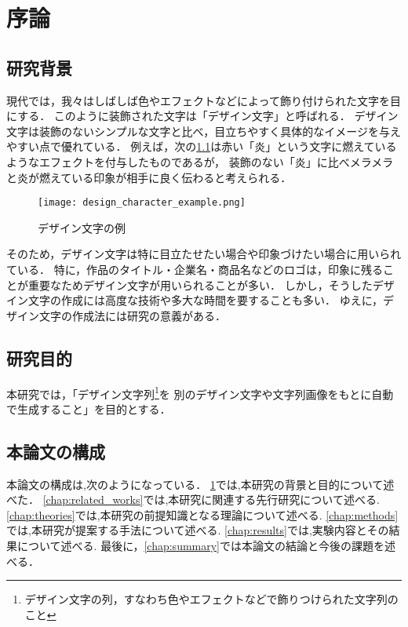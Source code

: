 \documentclass[\homedir/main.tex]{subfiles}
\begin{document}
\setcounter{chapter}{0}
\chapter{序論}\label{chap:introduction}

\section{研究背景}\label{sec:background}
現代では，我々はしばしば色やエフェクトなどによって飾り付けられた文字を目にする．
このように装飾された文字は「デザイン文字」と呼ばれる．
デザイン文字は装飾のないシンプルな文字と比べ，目立ちやすく具体的なイメージを与えやすい点で優れている．
例えば，次の\cref{fig:design_char_eg}は赤い「炎」という文字に燃えているようなエフェクトを付与したものであるが，
装飾のない「炎」に比べメラメラと炎が燃えている印象が相手に良く伝わると考えられる．

\begin{figure}[h]
    \centering
    \texttt{[image: design\_character\_example.png]}
    \caption{デザイン文字の例}
    \label{fig:design_char_eg}
\end{figure}

そのため，デザイン文字は特に目立たせたい場合や印象づけたい場合に用いられている．
特に，作品のタイトル・企業名・商品名などのロゴは，印象に残ることが重要なためデザイン文字が用いられることが多い．
しかし，そうしたデザイン文字の作成には高度な技術や多大な時間を要することも多い．
ゆえに，デザイン文字の作成法には研究の意義がある．

\section{研究目的}\label{sec:objective}
本研究では，「デザイン文字列\footnote{デザイン文字の列，すなわち色やエフェクトなどで飾りつけられた文字列のこと}を
別のデザイン文字や文字列画像をもとに自動で生成すること」を目的とする．

\section{本論文の構成}\label{sec:structure}
本論文の構成は,次のようになっている．
\cref{chap:introduction}では,本研究の背景と目的について述べた．
\cref{chap:related_works}では,本研究に関連する先行研究について述べる.
\cref{chap:theories}では,本研究の前提知識となる理論について述べる.
\cref{chap:methods}では,本研究が提案する手法について述べる.
\cref{chap:results}では,実験内容とその結果について述べる.
最後に，\cref{chap:summary}では本論文の結論と今後の課題を述べる．

\printBibForSubfiles
\end{document}
